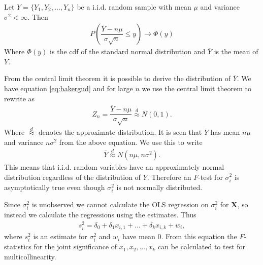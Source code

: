 \begin{theorem} \label{th:Central_limit_theorem}
Let $Y = \{ Y_1, Y_2, \ldots, Y_n \}$ be a i.i.d.$\!$ random sample with mean $\mu$ and variance $\sigma^2 < \infty$. Then
\begin{align} \label{eq:bakergud}
    P\left(\dfrac{\overline{Y} - n\mu}{\sigma \sqrt{n}}\leq y\right) \rightarrow \Phi(y)
\end{align}
Where $\Phi(y)$ is the cdf of the standard normal distribution and $\overline{Y}$ is the mean of $Y$. 
\end{theorem}
From the central limit theorem it is possible to derive the distribution of $\overline{Y}$. We have 
equation \eqref{eq:bakergud} and for large $n$ we use the central limit theorem to rewrite as
\begin{align*}
    Z_n = \dfrac{\overline{Y} - n\mu}{\sigma \sqrt{n}} \stackrel{d}{\approx} N(0,1). 
\end{align*}
Where $\stackrel{d}{\approx}$ denotes the approximate distribution. It is seen that $\overline{Y}$ has mean $n\mu$ and variance $n \sigma^2$ from the above equation. We use this to write
\begin{align*}
    \overline{Y} \stackrel{d}{\approx} N(n\mu, n\sigma^2). 
\end{align*}
This means that i.i.d. random variables have an approximately normal distribution regardless of the distribution of $Y$. Therefore an $F$-test for $\sigma_i^2$ is asymptotically true even though $\sigma_i^2$ is not normally distributed.  




Since $\sigma^2_i$ is unobserved we cannot calculate the OLS regression on $\sigma_i^2$ for $\mathbf{X}$, so instead we calculate the regressions using the estimates. Thus
\begin{align}\label{eq:OLS_residual_hat_epsioln_i_anden}
    s_i^2 = \delta_0 + \delta_1x_{i,1} + \ldots + \delta_kx_{i,k} + w_i,
\end{align}
where $s^2_i$ is an estimate for $\sigma^2_i$ and $w_i$ have mean 0. From this equation the $F$-statistics for the joint significance of $x_1, x_2, \ldots, x_k$ can be calculated to test for multicollinearity. 

